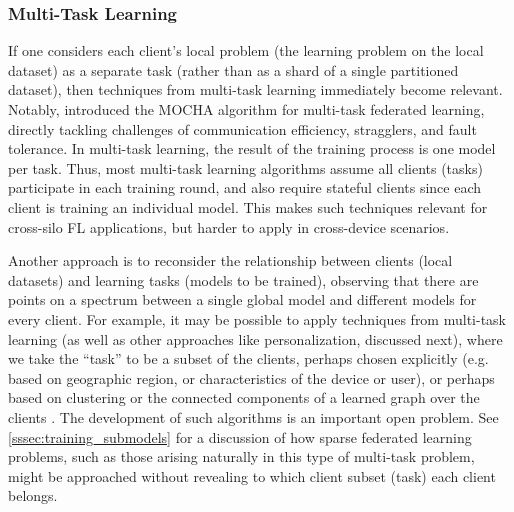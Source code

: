 \documentclass[11pt]{article}
\begin{document}


\subsubsection{Multi-Task Learning}
\label{sss:multitask-learning}
If one considers each client's local problem (the learning problem on the local dataset) as a separate task (rather than as a shard of a single partitioned dataset), then techniques from multi-task learning \citep{DBLP:journals/corr/ZhangY17aa} immediately become relevant. Notably, \citet{Smith2017} introduced the MOCHA algorithm for multi-task federated learning, directly tackling challenges of communication efficiency, stragglers, and fault tolerance. In multi-task learning, the result of the training process is one model per task. Thus, most multi-task learning algorithms assume all clients (tasks) participate in each training round, and also require stateful clients since each client is training an individual model. This makes such techniques relevant for cross-silo FL applications, but harder to apply in cross-device scenarios.

Another approach is to reconsider the relationship between clients (local datasets) and learning tasks (models to be trained), observing that there are points on a spectrum between a single global model and different models for every client. For example, it may be possible to apply techniques from multi-task learning (as well as other approaches like personalization, discussed next), where we take the ``task'' to be a subset of the clients, perhaps chosen explicitly (e.g. based on geographic region, or characteristics of the device or user), or perhaps based on clustering \citep{mansour2020three} or the connected components of a learned graph over the clients \citep{Zantedeschi2019}. The development of such algorithms is an important open problem.  See \cref{sssec:training_submodels} for a discussion of how sparse federated learning problems, such as those arising naturally in this type of multi-task problem, might be approached without revealing to which client subset (task) each client belongs.
\end{document}
